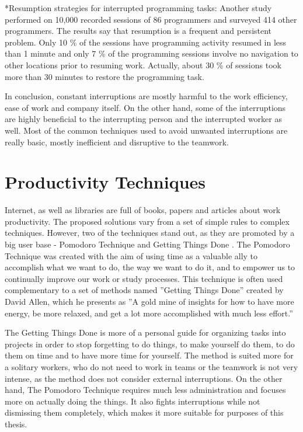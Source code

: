 \documentclass[11pt,singleside]{myfithesis2}
\makeatletter
\renewcommand\paragraph{
   \vspace{-10pt}
   \@startsection{paragraph}{4}{0mm}
      {\baselineskip}
      {- 5pt}
      {\normalfont\normalsize\bfseries}
}
\makeatother
\begin{document}
\paragraph*{Resumption strategies for interrupted programming tasks: } Another study \cite{studyResumptionStrategies} performed on 10,000 recorded sessions of 86 programmers and surveyed 414 other programmers. The results say that resumption is a frequent and persistent problem. Only 10 \% of the sessions have programming activity resumed in less than 1 minute and only 7 \% of the programming sessions involve no navigation to other locations prior to resuming work. Actually, about 30 \% of sessions took more than 30 minutes to restore the programming task.

In conclusion, constant interruptions are mostly harmful to the work efficiency, ease of work and company itself. On the other hand, some of the interruptions are highly beneficial to the interrupting person and the interrupted worker as well. Most of the common techniques used to avoid unwanted interruptions are really basic, mostly inefficient and disruptive to the teamwork.

	\section{Productivity Techniques}
Internet, as well as libraries are full of books, papers and articles about work productivity. The proposed solutions vary from a set of simple rules to complex techniques. However, two of the techniques stand out, as they are promoted by a big user base - Pomodoro Technique \cite{pomodoro} and Getting Things Done \cite{gtd}. The Pomodoro Technique was created with the aim of using time as a valuable ally to accomplish what we want to do, the way we want to do it, and to empower us to continually improve our work or study processes. This technique is often used complementary to a set of methods named ''Getting Things Done'' created by David Allen, which he presents as ''A gold mine of insights for how to have more energy, be more relaxed, and get a lot more accomplished with much less effort.''	
	
The Getting Things Done is more of a personal guide for organizing tasks into projects in order to stop forgetting to do things, to make yourself do them, to do them on time and to have more time for yourself. The method is suited more for a solitary workers, who do not need to work in teams or the teamwork is not very intense, as the method does not consider external interruptions. On the other hand, The Pomodoro Technique requires much less administration and focuses more on actually doing the things. It also fights interruptions while not dismissing them completely, which makes it more suitable for purposes of this thesis.
\end{document}
